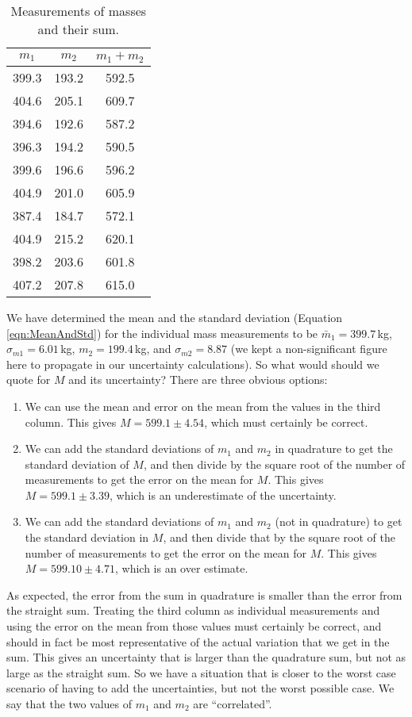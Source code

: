 \begin{table}[h]
\center
\begin{tabular}{ |c|c|c| }
  \hline
  \textbf{$m_1$} & \textbf{$m_2$} & \textbf{$m_1+m_2$}\\
  \hline
  399.3 & 193.2& 592.5 \\ 
  \hline
  404.6 & 205.1& 609.7 \\ 
  \hline
  394.6 & 192.6& 587.2 \\ 
  \hline
  396.3 & 194.2& 590.5 \\ 
  \hline
  399.6 & 196.6& 596.2 \\ 
  \hline
  404.9 & 201.0& 605.9 \\ 
  \hline
  387.4 & 184.7& 572.1 \\ 
  \hline
  404.9 & 215.2& 620.1 \\ 
  \hline
  398.2 & 203.6& 601.8 \\ 
  \hline
  407.2 & 207.8& 615.0 \\ 
  \hline
\end{tabular}
\caption{\label{tab:massSum}Measurements of masses and their sum.}
\end{table}
We have determined the mean and the standard deviation (Equation \ref{eqn:MeanAndStd}) for the individual mass measurements to be $\bar m_1 = 399.7$\,kg, $ \sigma_{m1} = 6.01$\,kg, $m_2=199.4$\,kg, and $\sigma_{m2} =  8.87$ (we kept a non-significant figure here to propagate in our uncertainty calculations). So what would should we quote for $M$ and its uncertainty? There are three obvious options:
\begin{enumerate}
\item We can use the mean and error on the mean from the values in the third column. This gives $M=599.1 \pm 4.54$, which must certainly be correct.
\item We can add the standard deviations of $m_1$ and $m_2$ in quadrature to get the standard deviation of $M$, and then divide by the square root of the number of measurements to get the error on the mean for $M$. This gives $M= 599.1 \pm 3.39$, which is an underestimate of the uncertainty.
\item We can add the standard deviations of $m_1$ and $m_2$ (not in quadrature) to get the standard deviation in $M$, and then divide that by the square root of the number of measurements to get the error on the mean for $M$. This gives $M= 599.10 \pm 4.71$, which is an over estimate.
\end{enumerate}

As expected, the error from the sum in quadrature is smaller than the error from the straight sum. Treating the third column as individual measurements and using the error on the mean from those values must certainly be correct, and should in fact be most representative of the actual variation that we get in the sum. This gives an uncertainty that is larger than the quadrature sum, but not as large as the straight sum. So we have a situation that is closer to the worst case scenario of having to add the uncertainties, but not the worst possible case. We say that the two values of $m_1$ and $m_2$ are ``correlated''. 

